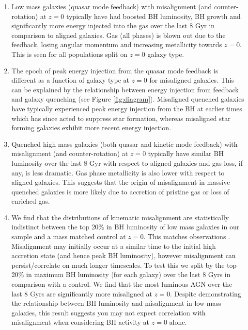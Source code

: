 \documentclass[fleqn,usenatbib]{mnras}
\begin{document}
\begin{enumerate}
    \item Low mass galaxies (quasar mode feedback) with misalignment (and counter-rotation) at $z=0$ typically have had boosted BH luminosity, BH growth and significantly more energy injected into the gas over the last 8 Gyr in comparison to aligned galaxies. Gas (all phases) is blown out due to the feedback, losing angular momentum and increasing metallicity towards $z=0$. This is seen for all populations split on $z=0$ galaxy type.
    
    \item The epoch of peak energy injection from the quasar mode feedback is different as a function of galaxy type at $z=0$ for misaligned galaxies. This can be explained by the relationship between energy injection from feedback and galaxy quenching (see Figure \ref{fig:diagram}). Misaligned quenched galaxies have typically experienced peak energy injection from the BH at earlier times which has since acted to suppress star formation, whereas misaligned star forming galaxies exhibit more recent energy injection. 

    \item Quenched high mass galaxies (both quasar and kinetic mode feedback) with misalignment (and counter-rotation) at $z=0$ typically have similar BH luminosity over the last 8 Gyr with respect to aligned galaxies and gas loss, if any, is less dramatic. Gas phase metallicity is also lower with respect to aligned galaxies. This suggests that the origin of misalignment in massive quenched galaxies is more likely due to accretion of pristine gas or loss of enriched gas.
    
    \item We find that the distributions of kinematic misalignment are statistically indistinct between the top 20\% in BH luminosity of low mass galaxies in our sample and a mass matched control at $z=0$. This matches observations \citep[see Figure 6 in][]{ilha2019}. Misalignment may initially occur at a similar time to the initial high accretion state (and hence peak BH luminosity), however misalignment can persist/correlate on much longer timescales. To test this we split by the top 20\% in maximum BH luminosity (for each galaxy) over the last 8 Gyrs in comparison with a control. We find that the most luminous AGN over the last 8 Gyrs are significantly more misaligned at $z=0$. Despite demonstrating the relationship between BH luminosity and misalignment in low mass galaxies, this result suggests you may not expect correlation with misalignment when considering BH activity at $z=0$ alone.
\end{enumerate}
\end{document}
